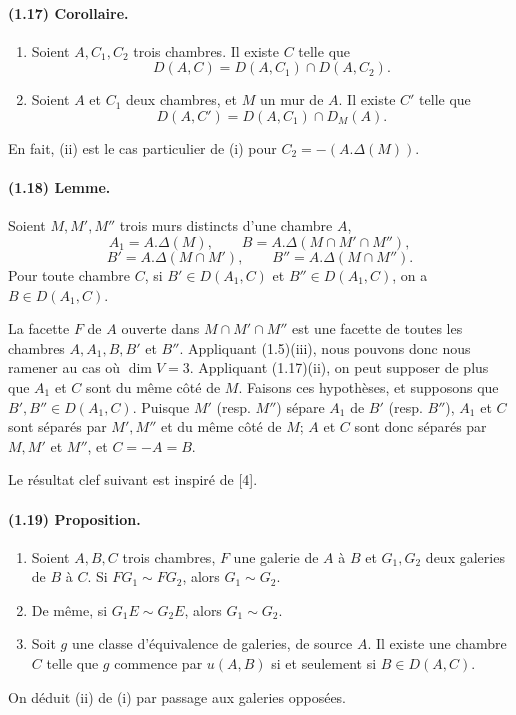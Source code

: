 \documentclass[10pt,a4paper]{article}
\begin{document}
\paragraph{(1.17) Corollaire.} \begin{enumerate}[label=(\roman*)]
\item Soient $A,C_1,C_2$ trois chambres. Il existe $C$ telle que
\[
\tag{1.17.1}
D(A,C)=D(A,C_1)\cap D(A,C_2).
\]
\item Soient $A$ et $C_1$ deux chambres, et $M$ un mur de $A$. Il existe $C'$ telle que
\[
\tag{1.17.2}
D(A,C')=D(A,C_1)\cap D_M(A).
\]
\end{enumerate}
En fait, (ii) est le cas particulier de (i) pour $C_2=-(A.\Delta(M))$.

\paragraph{(1.18) Lemme.} Soient $M,M',M''$ trois murs distincts d'une chambre $A$,
\[
A_1=A.\Delta(M),\qquad B=A.\Delta(M\cap M'\cap M''),
\]
\[
B'=A.\Delta(M\cap M'),\qquad B''=A.\Delta(M\cap M'').
\]
Pour toute chambre $C$, si $B'\in D(A_1,C)$ et $B''\in D(A_1,C)$, on a $B\in D(A_1,C)$.

La facette $F$ de $A$ ouverte dans $M\cap M'\cap M''$ est une facette de toutes les chambres $A,A_1,B,B'$ et $B''$. Appliquant (1.5)(iii), nous pouvons donc nous ramener au cas où $\dim V=3$. Appliquant (1.17)(ii), on peut supposer de plus que $A_1$ et $C$ sont du même côté de $M$. Faisons ces hypothèses, et supposons que $B',B''\in D(A_1,C)$. Puisque $M'$ (resp. $M''$) sépare $A_1$ de $B'$ (resp. $B''$), $A_1$ et $C$ sont séparés par $M',M''$ et du même côté de $M$; $A$ et $C$ sont donc séparés par $M,M'$ et $M''$, et $C=-A=B$.

Le résultat clef suivant est inspiré de [4].

\paragraph{(1.19) Proposition.} \begin{enumerate}[label=(\roman*)]
\item Soient $A,B,C$ trois chambres, $F$ une galerie de $A$ à $B$ et $G_1,G_2$ deux galeries de $B$ à $C$. Si $FG_1\sim FG_2$, alors $G_1\sim G_2$.
\item De même, si $G_1E\sim G_2E$, alors $G_1\sim G_2$.
\item Soit $g$ une classe d'équivalence de galeries, de source $A$. Il existe une chambre $C$ telle que $g$ commence par $u(A,B)$ si et seulement si $B\in D(A,C)$.
\end{enumerate}
On déduit (ii) de (i) par passage aux galeries opposées.
\end{document}
